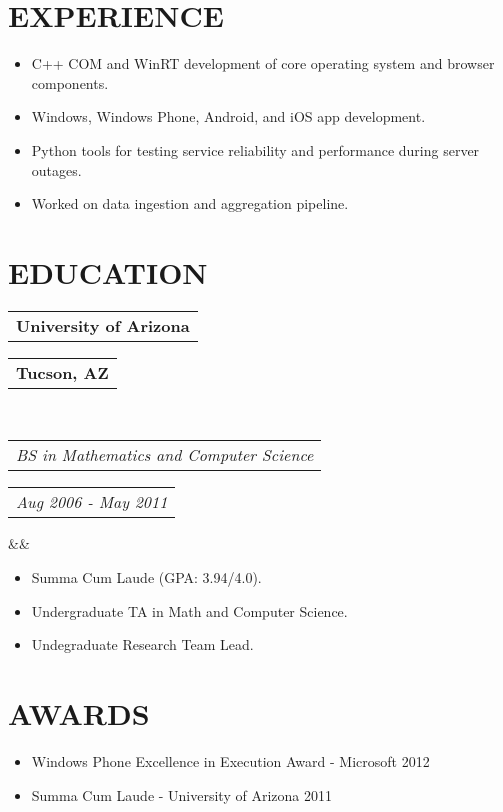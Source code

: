 \documentclass[11pt,a4paper,roman]{moderncv}
\makeatletter
\newcommand*{\customcventry}[7][.25em]{
  \begin{tabular}{@{}l} 
    {\bfseries #4}
  \end{tabular}
  \hfill %
  \begin{tabular}{l@{}}
     {\bfseries #5}
  \end{tabular} \\
  \begin{tabular}{@{}l} 
    {\itshape #3}
  \end{tabular}
  \hfill %
  \begin{tabular}{l@{}}
     {\itshape #2}
  \end{tabular}
  \ifx&#7&%
  \else{\\%
    \begin{minipage}{\maincolumnwidth}%
      \small#7%
    \end{minipage}}\fi%
  \par\addvspace{#1}}
\makeatother
\begin{document}
\section{EXPERIENCE}
{}
{\begin{itemize}
  \item C++ COM and WinRT development of core operating system and browser components.
  \item Windows, Windows Phone, Android, and iOS app development.
\end{itemize}
}

{}
{\begin{itemize}
  \item Python tools for testing service reliability and performance during server outages.
  \item Worked on data ingestion and aggregation pipeline.
\end{itemize}
}

\section{EDUCATION}
{\customcventry{Aug 2006 - May 2011}{BS in Mathematics and Computer Science}{University of Arizona}{Tucson, AZ}{}{}}
{\begin{itemize}
  \item Summa Cum Laude (GPA: 3.94/4.0).
  \item Undergraduate TA in Math and Computer Science.
  \item Undegraduate Research Team Lead.
  {
  }
\end{itemize}
}


\section{AWARDS}
{\begin{itemize}
    \item Windows Phone Excellence in Execution Award - Microsoft 2012
    \item Summa Cum Laude - University of Arizona 2011
  \end{itemize}
}
\end{document}
